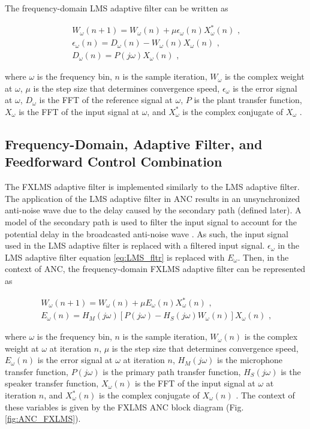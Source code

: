 \documentclass[11pt, letterpaper]{article}
\numberwithin{equation}{section}
\begin{document}
\pagebreak

The frequency-domain LMS adaptive filter can be written as

\begin{gather} \label{eq:LMS_fltr}
    W_\omega(n+1) = W_\omega(n) + \mu \epsilon_\omega(n) X_\omega^*(n) \text{ ,}\\
    \epsilon_\omega(n) = D_\omega(n) - W_\omega(n) X_\omega(n)  \text{ ,}\\
    D_\omega(n) = P(j \omega) X_\omega(n) \text{ ,}
\end{gather}

where $\omega$ is the frequency bin, $n$ is the sample iteration, $W_\omega$ is the complex weight at $\omega$, $\mu$ is the step size that determines convergence speed, $\epsilon_\omega$ is the error signal at $\omega$, $D_\omega$ is the FFT of the reference signal at $\omega$, $P$ is the plant transfer function, $X_\omega$ is the FFT of the input signal at $\omega$, and $X_\omega^*$ is the complex conjugate of $X_\omega$ \cite{feintuch}.

\subsection{Frequency-Domain, Adaptive Filter, and Feedforward Control Combination}

The FXLMS adaptive filter is implemented similarly to the LMS adaptive filter. The application of the LMS adaptive filter in ANC results in an unsynchronized anti-noise wave due to the delay caused by the secondary path (defined later). A model of the secondary path is used to filter the input signal to account for the potential delay in the broadcasted anti-noise wave \cite{kuo}. As such, the input signal used in the LMS adaptive filter is replaced with a filtered input signal. $\epsilon_\omega$ in the LMS adaptive filter equation \ref{eq:LMS_fltr} is replaced with $E_\omega$. Then, in the context of ANC, the frequency-domain FXLMS adaptive filter can be represented as

\begin{gather}
    W_\omega(n+1) = W_\omega(n) + \mu E_\omega(n) X_\omega^*(n) \text{ ,}\\
    E_\omega(n) = H_M(j \omega) [P(j \omega) - H_S(j \omega) W_\omega(n)] X_\omega(n)  \text{ ,}
\end{gather}

where $\omega$ is the frequency bin, $n$ is the sample iteration, $W_\omega(n)$ is the complex weight at $\omega$ at iteration $n$, $\mu$ is the step size that determines convergence speed, $E_\omega(n)$ is the error signal at $\omega$ at iteration $n$, $H_M(j \omega)$ is the microphone transfer function, $P(j \omega)$ is the primary path transfer function, $H_S(j \omega)$ is the speaker transfer function, $X_\omega(n)$ is the FFT of the input signal at $\omega$ at iteration $n$, and $X_\omega^*(n)$ is the complex conjugate of $X_\omega(n)$ \cite{feintuch}. The context of these variables is given by the FXLMS ANC block diagram (Fig. \ref{fig:ANC_FXLMS}).
\end{document}

